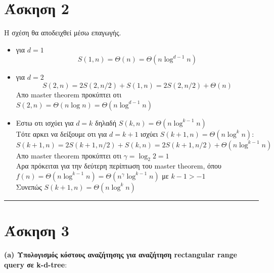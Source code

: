 \documentclass[12pt]{article}
\begin{document}
\section*{Άσκηση 2}
Η σχέση θα αποδειχθεί μέσω επαγωγής.
\begin{itemize}
    \item για $d=1$  $$S(1,n) = \Theta(n)= \Theta(n\log ^{d-1}n)$$
    \item για $d=2$  $$S(2,n) =2S(2,n/2) +S(1,n)=2S(2,n/2) + \Theta(n) $$
        Aπο \textlatin{master theorem} προκύπτει οτι $S(2,n) = \Theta(n\log n)=\Theta(n\log ^{d-1}n)$
    \item Εστω οτι ισχύει για $d=k$ δηλαδή $S(k,n) =\Theta(n\log ^{k-1}n)$\\
        Tότε αρκει να δείξουμε οτι για $d=k+1$ ισχύει $S(k+1,n) =\Theta(n\log ^{k}n)$:
        $$S(k+1,n) =2S(k+1,n/2) +S(k,n)=2S(k+1,n/2) + \Theta(n\log ^{k-1}n) $$
        Aπο \textlatin{master theorem} προκύπτει οτι $\gamma = \log_2 2 = 1$\\
        Αρα πρόκειται για την δεύτερη περίπτωση του \textlatin{master theorem}, όπου $f(n) =\Theta(n\log ^{k-1}n) = \Theta(n^\gamma\log ^{k-1}n)$ με $k-1>-1$\\
        Συνεπώς $S(k+1,n) =\Theta(n\log ^{k}n) $
\end{itemize}
\rule{\textwidth}{.5pt}
\section*{Άσκηση 3}
{\bf (\textlatin{a}) Υπολογισμός κόστους αναζήτησης για αναζήτηση \textlatin{rectangular range query} σε \textlatin{k-d-tree}}:\\
\end{document}
